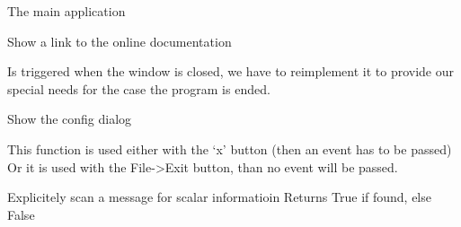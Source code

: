 \documentclass[letterpaper,10pt,english]{sphinxmanual}
\begin{document}
\begin{fulllineitems}
\label{muonic:muonic.gui.MainWindow.MainWindow}
The main application

\begin{fulllineitems}
\label{muonic:muonic.gui.MainWindow.MainWindow.about_menu}
Show a link to the online documentation

\end{fulllineitems}


\begin{fulllineitems}
\label{muonic:muonic.gui.MainWindow.MainWindow.closeEvent}
Is triggered when the window is closed, we have to reimplement it
to provide our special needs for the case the program is ended.

\end{fulllineitems}


\begin{fulllineitems}
\label{muonic:muonic.gui.MainWindow.MainWindow.config_menu}
Show the config dialog

\end{fulllineitems}


\begin{fulllineitems}
\label{muonic:muonic.gui.MainWindow.MainWindow.exit_program}
This function is used either with the `x' button
(then an event has to be passed)
Or it is used with the File-\textgreater{}Exit button, than no event
will be passed.

\end{fulllineitems}


\begin{fulllineitems}
\label{muonic:muonic.gui.MainWindow.MainWindow.get_scalars_from_queue}
Explicitely scan a message for scalar informatioin
Returns True if found, else False


\end{fulllineitems}
\end{fulllineitems}
\end{document}
